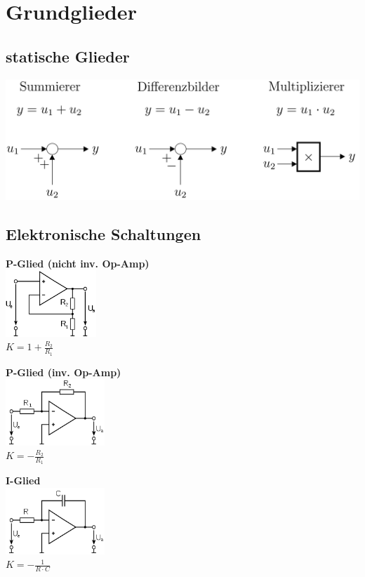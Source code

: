 \section{Grundglieder }

	\subsection{statische Glieder }
		\includegraphics[width=10 cm]{./bilder/grundglieder/statischeGlieder.png} \\
		
	\subsection {Elektronische Schaltungen}
		\begin{minipage}{7cm}
			\textbf{P-Glied (nicht inv. Op-Amp)}\\
			\includegraphics[height=2.5cm]{./bilder/OP-Amp.png} \\
			$K = 1 + \frac{R_2}{R_1}$
		\end{minipage}
		\begin{minipage}{6cm}
			\textbf{P-Glied (inv. Op-Amp)} \\ 
			\includegraphics[height=2.5cm]{./bilder/OP-InvAmp.png} \\
			$K=-\frac{R_2}{R_1}$
		\end{minipage}
		\begin{minipage}{6cm}
			\textbf{I-Glied} \\ 
			\includegraphics[height=2.5cm]{./bilder/OP-Integrator.png}\\
			$K = - \frac{1}{R \cdot C}$
		\end{minipage}  
	
